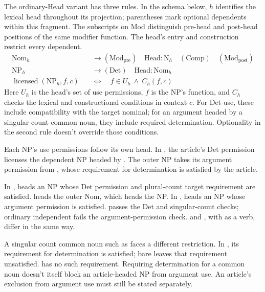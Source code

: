 \documentclass[12pt]{article}
\begin{document}
The ordinary-Head variant has three rules. In the schema below, $h$ identifies the lexical head throughout its projection; parentheses mark optional dependents within this fragment. The subscripts on Mod distinguish pre-head and post-head positions of the same modifier function. The head's entry and construction restrict every dependent.
\[
\begin{aligned}
\mathrm{Nom}_{h} &\to (\mathrm{Mod}_{\mathrm{pre}})\quad \mathrm{Head}:\mathrm{N}_{h}\quad (\mathrm{Comp})\quad (\mathrm{Mod}_{\mathrm{post}}) \\
\mathrm{NP}_{h} &\to (\mathrm{Det})\quad \mathrm{Head}:\mathrm{Nom}_{h} \\
\operatorname{licensed}(\mathrm{NP}_{h},f,c)\quad &\Longleftrightarrow\quad f\in U_h\ \land\ C_h(f,c)
\end{aligned}
\]
Here $U_h$ is the head's set of use permissions, $f$ is the NP's function, and $C_h$ checks the lexical and constructional conditions in context $c$. For Det use, these include compatibility with the target nominal; for an argument headed by a singular count common noun, they include required determination. Optionality in the second rule doesn't override those conditions.

Each NP's use permissions follow its own head. In , the article's Det permission licenses the dependent NP headed by . The outer NP takes its argument permission from , whose requirement for determination is satisfied by the article.

In ,  heads an NP whose Det permission and plural-count target requirement are satisfied.  heads the outer Nom, which heads the NP. In ,  heads an NP whose argument permission is satisfied.  passes the Det and singular-count checks; ordinary independent  fails the argument-permission check.  and , with  as a verb, differ in the same way.

A singular count common noun such as  faces a different restriction. In , its requirement for determination is satisfied; bare  leaves that requirement unsatisfied.  has no such requirement. Requiring determination for a common noun doesn't itself block an article-headed NP from argument use. An article's exclusion from argument use must still be stated separately.
\end{document}
